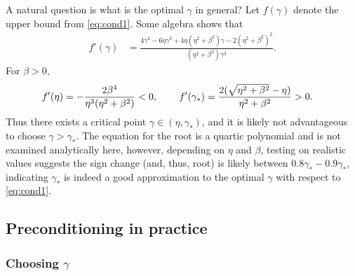 \documentclass[review]{siamart}
\begin{document}
%
\begin{remark}
A natural question is what is the optimal $\gamma$ in general?
Let $f(\gamma)$ denote the upper bound from  \eqref{eq:cond1}.
Some algebra shows that
%
\begin{align*}
f'(\gamma) &= \frac{4\gamma^4 - 6\eta\gamma^3 + 4\eta(\eta^2+\beta^2)\gamma -
	2(\eta^2+\beta^2)^2}{(\eta^2+\beta^2)\gamma^3}.
\end{align*}
%
For $\beta > 0$,
%
\begin{align*}
f'(\eta) & = -\frac{2\beta^4}{\eta^3(\eta^2+\beta^2)} < 0,
\hspace{5ex}
f'(\gamma_*) = \frac{2(\sqrt{\eta^2+\beta^2} - \eta)}{\eta^2+\beta^2} > 0.
\end{align*}
%
Thus there exists a critical point $\gamma \in(\eta,\gamma_*)$, and it is
likely not advantageous to choose $\gamma > \gamma_*$. The equation
for the root is a quartic polynomial and is not examined analytically here,
however, depending on $\eta$ and $\beta$, testing on realistic values suggests
the sign change (and, thus, root) is likely between $0.8\gamma_* - 0.9\gamma_*$,
indicating $\gamma_*$ is indeed a good approximation to the optimal $\gamma$ with
respect to \eqref{eq:cond1}.
\end{remark}
%



\subsection{Preconditioning in practice}


\subsubsection{Choosing $\gamma$}
\end{document}
